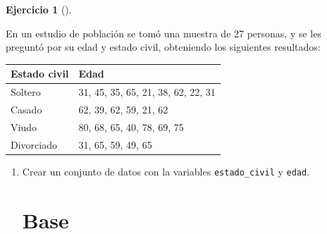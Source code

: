 \documentclass[
  a4paper,
]{scrreport}
\theoremstyle{definition}
\newtheorem{exercise}{Ejercicio}[chapter]
\theoremstyle{remark}
\begin{document}
\begin{exercise}[]\protect\hypertarget{exr-frecuencias-graficos-estado-civil-edades}{}\label{exr-frecuencias-graficos-estado-civil-edades}

En un estudio de población se tomó una muestra de 27 personas, y se les
preguntó por su edad y estado civil, obteniendo los siguientes
resultados:

\begin{longtable}[]{@{}ll@{}}
\toprule\noalign{}
Estado civil & Edad \\
\midrule\noalign{}
\endhead
\bottomrule\noalign{}
\endlastfoot
Soltero & 31, 45, 35, 65, 21, 38, 62, 22, 31 \\
Casado & 62, 39, 62, 59, 21, 62 \\
Viudo & 80, 68, 65, 40, 78, 69, 75 \\
Divorciado & 31, 65, 59, 49, 65 \\
\end{longtable}

\begin{enumerate}
\def\labelenumi{\alph{enumi}.}
\item
  Crear un conjunto de datos con la variables \texttt{estado\_civil} y
  \texttt{edad}.

  \begin{tcolorbox}[enhanced jigsaw, colframe=quarto-callout-tip-color-frame, toprule=.15mm, bottomtitle=1mm, breakable, opacitybacktitle=0.6, toptitle=1mm, colback=white, bottomrule=.15mm, title=\textcolor{quarto-callout-tip-color}{\faLightbulb}\hspace{0.5em}{Solución}, arc=.35mm, left=2mm, titlerule=0mm, rightrule=.15mm, coltitle=black, leftrule=.75mm, opacityback=0, colbacktitle=quarto-callout-tip-color!10!white]

  \section{Base}


\end{tcolorbox}
\end{enumerate}
\end{exercise}
\end{document}
